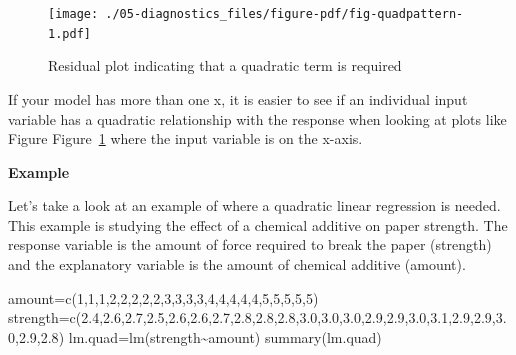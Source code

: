 \documentclass[
  letterpaper,
  DIV=11,
  numbers=noendperiod]{scrreprt}
\newenvironment{Shaded}{\begin{snugshade}}{\end{snugshade}}
\newcommand{\DecValTok}[1]{\textcolor[rgb]{0.68,0.00,0.00}{#1}}
\newcommand{\FloatTok}[1]{\textcolor[rgb]{0.68,0.00,0.00}{#1}}
\newcommand{\FunctionTok}[1]{\textcolor[rgb]{0.28,0.35,0.67}{#1}}
\newcommand{\NormalTok}[1]{\textcolor[rgb]{0.00,0.23,0.31}{#1}}
\newcommand{\OtherTok}[1]{\textcolor[rgb]{0.00,0.23,0.31}{#1}}
\newcommand{\SpecialCharTok}[1]{\textcolor[rgb]{0.37,0.37,0.37}{#1}}
\begin{document}
\begin{figure}

{\centering \texttt{[image: ./05-diagnostics\_files/figure-pdf/fig-quadpattern-1.pdf]}

}

\caption{\label{fig-quadpattern}Residual plot indicating that a
quadratic term is required}

\end{figure}

If your model has more than one x, it is easier to see if an individual
input variable has a quadratic relationship with the response when
looking at plots like Figure Figure~\ref{fig-quadpattern} where the
input variable is on the x-axis.

\textbf{Example}

Let's take a look at an example of where a quadratic linear regression
is needed. This example is studying the effect of a chemical additive on
paper strength. The response variable is the amount of force required to
break the paper (strength) and the explanatory variable is the amount of
chemical additive (amount).

\begin{Shaded}
\begin{Highlighting}[]
\NormalTok{ amount}\OtherTok{=}\FunctionTok{c}\NormalTok{(}\DecValTok{1}\NormalTok{,}\DecValTok{1}\NormalTok{,}\DecValTok{1}\NormalTok{,}\DecValTok{2}\NormalTok{,}\DecValTok{2}\NormalTok{,}\DecValTok{2}\NormalTok{,}\DecValTok{2}\NormalTok{,}\DecValTok{2}\NormalTok{,}\DecValTok{3}\NormalTok{,}\DecValTok{3}\NormalTok{,}\DecValTok{3}\NormalTok{,}\DecValTok{3}\NormalTok{,}\DecValTok{4}\NormalTok{,}\DecValTok{4}\NormalTok{,}\DecValTok{4}\NormalTok{,}\DecValTok{4}\NormalTok{,}\DecValTok{4}\NormalTok{,}\DecValTok{5}\NormalTok{,}\DecValTok{5}\NormalTok{,}\DecValTok{5}\NormalTok{,}\DecValTok{5}\NormalTok{,}\DecValTok{5}\NormalTok{)}
\NormalTok{ strength}\OtherTok{=}\FunctionTok{c}\NormalTok{(}\FloatTok{2.4}\NormalTok{,}\FloatTok{2.6}\NormalTok{,}\FloatTok{2.7}\NormalTok{,}\FloatTok{2.5}\NormalTok{,}\FloatTok{2.6}\NormalTok{,}\FloatTok{2.6}\NormalTok{,}\FloatTok{2.7}\NormalTok{,}\FloatTok{2.8}\NormalTok{,}\FloatTok{2.8}\NormalTok{,}\FloatTok{2.8}\NormalTok{,}\FloatTok{3.0}\NormalTok{,}\FloatTok{3.0}\NormalTok{,}\FloatTok{3.0}\NormalTok{,}\FloatTok{2.9}\NormalTok{,}\FloatTok{2.9}\NormalTok{,}\FloatTok{3.0}\NormalTok{,}\FloatTok{3.1}\NormalTok{,}\FloatTok{2.9}\NormalTok{,}\FloatTok{2.9}\NormalTok{,}\FloatTok{3.0}\NormalTok{,}\FloatTok{2.9}\NormalTok{,}\FloatTok{2.8}\NormalTok{)}
\NormalTok{ lm.quad}\OtherTok{=}\FunctionTok{lm}\NormalTok{(strength}\SpecialCharTok{\textasciitilde{}}\NormalTok{amount)}
 \FunctionTok{summary}\NormalTok{(lm.quad)}
\end{Highlighting}
\end{Shaded}
\end{document}
